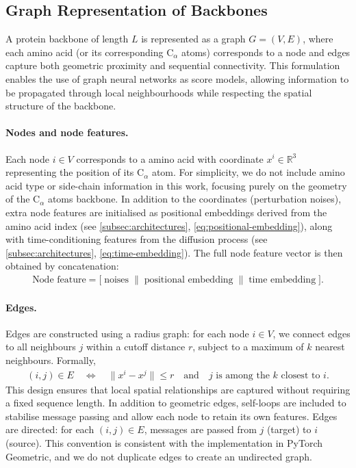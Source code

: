 \documentclass[a4paper,12pt]{article}
\begin{document}
\subsection{Graph Representation of Backbones}\label{subsec:graph-repr}
A protein backbone  of length \(L\) is represented as a graph \(G=(V,E)\), where each amino acid (or its corresponding C\(_\alpha\) atoms) corresponds to a node and edges capture both geometric proximity and sequential connectivity. This formulation enables the use of graph neural networks as score models, allowing information to be propagated through local neighbourhoods while respecting the spatial structure of the backbone. 

\paragraph{Nodes and node features.}
Each node \(i \in V\) corresponds to a amino acid with coordinate \(x^i \in \mathbb{R}^3\) representing the position of its C\(_\alpha\) atom. For simplicity, we do not include amino acid type or side-chain information in this work, focusing purely on the geometry of the C\(_\alpha\) atoms backbone. In addition to the coordinates (perturbation noises), extra node features are initialised as positional embeddings derived from the amino acid index (see \cref{subsec:architectures}, \cref{eq:positional-embedding}), along with time-conditioning features from the diffusion process (see \cref{subsec:architectures}, \cref{eq:time-embedding}). The full node feature vector is then obtained by concatenation:
\begin{align*}
    \text{Node feature} = \big[ \; \text{noises} \;\|\; \text{positional embedding} \;\|\; \text{time embedding} \;\big].
\end{align*}

\paragraph{Edges.}
Edges are constructed using a radius graph: for each node \(i\in V\), we connect edges to all neighbours \(j\) within a cutoff distance \(r\), subject to a maximum of \(k\) nearest neighbours. Formally,
\begin{align*}
    (i,j) \in E \quad \Leftrightarrow \quad \|x^i - x^j\| \leq r \quad \text{and}\quad j \text{ is among the } k \text{ closest to } i.
\end{align*}
This design ensures that local spatial relationships are captured without requiring a fixed sequence length. In addition to geometric edges, self-loops are included to stabilise message passing and allow each node to retain its own features. Edges are directed: for each \((i,j) \in E\), messages are passed from \(j\) (target) to \(i\) (source). This convention is consistent with the implementation in PyTorch Geometric, and we do not duplicate edges to create an undirected graph.
\end{document}
